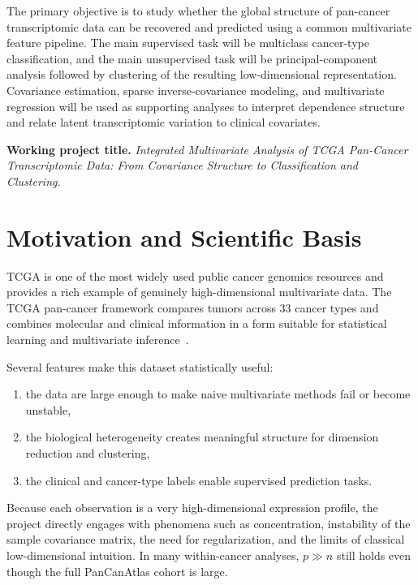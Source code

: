 \documentclass[12pt]{article}
\newcommand{\1}{\mathbf{1}}
\begin{document}
The primary objective is to study whether the global structure of pan-cancer transcriptomic data can be recovered and predicted using a common multivariate feature pipeline. The main supervised task will be multiclass cancer-type classification, and the main unsupervised task will be principal-component analysis followed by clustering of the resulting low-dimensional representation. Covariance estimation, sparse inverse-covariance modeling, and multivariate regression will be used as supporting analyses to interpret dependence structure and relate latent transcriptomic variation to clinical covariates.

\begin{importantbox}
\textbf{Working project title.}
\emph{Integrated Multivariate Analysis of TCGA Pan-Cancer Transcriptomic Data: From Covariance Structure to Classification and Clustering.}
\end{importantbox}

\section{Motivation and Scientific Basis}

TCGA is one of the most widely used public cancer genomics resources and provides a rich example of genuinely high-dimensional multivariate data. The TCGA pan-cancer framework compares tumors across \(33\) cancer types and combines molecular and clinical information in a form suitable for statistical learning and multivariate inference~\cite{TCGAPanCanAtlas,GDCPanCan}.

Several features make this dataset statistically useful:
\begin{enumerate}
    \item the data are large enough to make naive multivariate methods fail or become unstable,
    \item the biological heterogeneity creates meaningful structure for dimension reduction and clustering,
    \item the clinical and cancer-type labels enable supervised prediction tasks.
\end{enumerate}

Because each observation is a very high-dimensional expression profile, the project directly engages with phenomena such as concentration, instability of the sample covariance matrix, the need for regularization, and the limits of classical low-dimensional intuition. In many within-cancer analyses, \(p \gg n\) still holds even though the full PanCanAtlas cohort is large.
\end{document}
